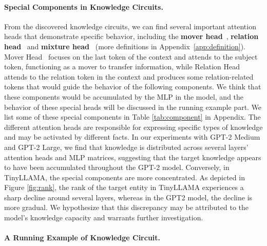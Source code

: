 \paragraph{Special Components in Knowledge Circuits.}
From the discovered knowledge circuits, we can find several important attention heads that demonstrate specific behavior, including the \textbf{mover head}~\cite{lv2024interpreting}, \textbf{relation head}~\cite{chughtai2024summing,ferrando2024primer} and \textbf{mixture head}~\cite{chughtai2024summing,ferrando2024primer} (more definitions in Appendix~\ref{app:definition}).
Mover Head~\cite{lv2024interpreting,merullo2023circuit} focuses on the last token of the context and attends to the subject token, functioning as a mover to transfer information, while Relation Head~\cite{chughtai2024summing} attends to the relation token in the context and produces some relation-related tokens that would guide the behavior of the following components.
We think that these components would be accumulated by the MLP in the model, and the behavior of these special heads will be discussed in the running example part.
We list some of these special components in Table \ref{tab:component} in Appendix. 
The different attention heads are responsible for expressing specific types of knowledge and may be activated by different facts.
In our experiments with GPT-2 Medium and GPT-2 Large, we find that knowledge is distributed across several layers' attention heads and MLP matrices, suggesting that the target knowledge appears to have been accumulated throughout the GPT-2 model.
Conversely, in TinyLLAMA, the special components are more concentrated.
As depicted in Figure \ref{fig:rank}, the rank of the target entity in TinyLLAMA experiences a sharp decline around several layers, whereas in the GPT2 model, the decline is more gradual. 
We hypothesize that this discrepancy may be attributed to the model's knowledge capacity \cite{knowledge_capacity} and warrants further investigation.
\paragraph{A Running Example of Knowledge Circuit.}
\label{sec:case_results}

